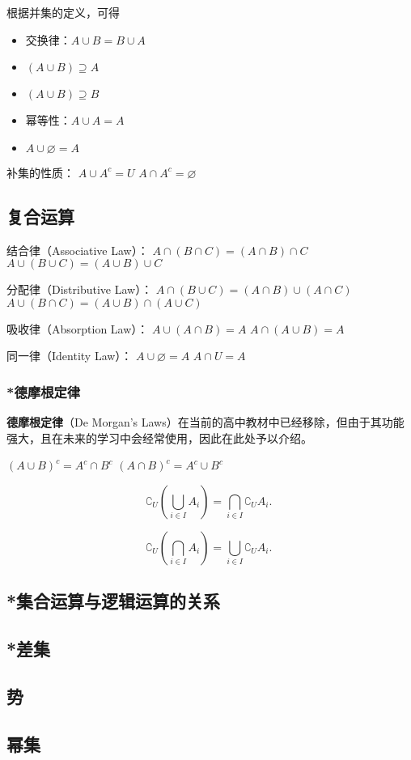 根据并集的定义，可得
\begin{itemize}
\item 交换律：$A\cup B = B\cup A$
\item $(A\cup B) \supseteq A$
\item $(A\cup B) \supseteq B$
\item 幂等性：$A\cup A = A$
\item $A\cup \varnothing = A$
\end{itemize}

补集的性质：
$ A \cup A^c = U $
$A \cap A^c = \varnothing$

\subsection{复合运算}
结合律（Associative Law）：
$ A \cap (B \cap C) = (A \cap B) \cap C$ 
$ A \cup (B \cup C) = (A \cup B) \cup C$

分配律（Distributive Law）：
$ A \cap (B \cup C) = (A \cap B) \cup (A \cap C) $
$ A \cup (B \cap C) = (A \cup B) \cap (A \cup C) $

吸收律（Absorption Law）：
$ A \cup (A \cap B) = A $
$ A \cap (A \cup B) = A $

同一律（Identity Law）：
$A \cup \varnothing = A$
$ A \cap U = A $
 
\subsubsection{*德摩根定律}

\textbf{德摩根定律}（De Morgan’s Laws）在当前的高中教材中已经移除，但由于其功能强大，且在未来的学习中会经常使用，因此在此处予以介绍。

$ (A \cup B)^c = A^c \cap B^c $
$ (A \cap B)^c = A^c \cup B^c $

\begin{equation}
\complement_U(\bigcup_{i\in I} A_i)=\bigcap_{i\in I} \complement_UA_i.~
\end{equation}

\begin{equation}
\complement_U(\bigcap_{i\in I} A_i)=\bigcup_{i\in I} {\complement_UA_i}.~
\end{equation}


\subsection{*集合运算与逻辑运算的关系}



\subsection{*差集}
\subsection{势}
\subsection{幂集}
